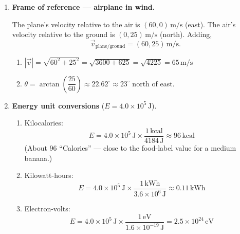 \documentclass[12pt, twoside]{article}
\begin{document}
\begin{enumerate}
\newpage

\item \textbf{Frame of reference --- airplane in wind.}

The plane's velocity relative to the air is $(60, 0)\,\text{m/s}$ (east). The air's velocity relative to the ground is $(0, 25)\,\text{m/s}$ (north). Adding,
\[
\vec{v}_{\text{plane/ground}} = (60, 25)\,\text{m/s}.
\]

\begin{enumerate}
\item $|\vec{v}| = \sqrt{60^2 + 25^2} = \sqrt{3600 + 625} = \sqrt{4225} = \boxed{65\,\text{m/s}}$

\item $\theta = \arctan\!\left(\dfrac{25}{60}\right) \approx 22.62^\circ \approx \boxed{23^\circ}$ north of east.
\end{enumerate}

\vspace{0.8cm}

\item \textbf{Energy unit conversions} ($E = 4.0\times 10^{5}\,\text{J}$).

\begin{enumerate}
\item Kilocalories:
\[
E = 4.0\times 10^{5}\,\text{J} \times \dfrac{1\,\text{kcal}}{4184\,\text{J}} \approx \boxed{96\,\text{kcal}}
\]
(About 96 ``Calories'' --- close to the food-label value for a medium banana.)

\item Kilowatt-hours:
\[
E = 4.0\times 10^{5}\,\text{J} \times \dfrac{1\,\text{kWh}}{3.6\times 10^{6}\,\text{J}} \approx \boxed{0.11\,\text{kWh}}
\]

\item Electron-volts:
\[
E = 4.0\times 10^{5}\,\text{J} \times \dfrac{1\,\text{eV}}{1.6\times 10^{-19}\,\text{J}} = \boxed{2.5\times 10^{24}\,\text{eV}}
\]
\end{enumerate}

\end{enumerate}
\end{document}
